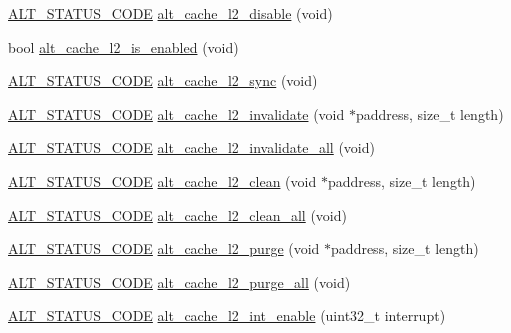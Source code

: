 \begin{DoxyCompactItemize}
\mbox{\hyperlink{hwlib_8h_abdb0d369f069723ca55d6c94bcaaaa12}{A\+L\+T\+\_\+\+S\+T\+A\+T\+U\+S\+\_\+\+C\+O\+DE}} \mbox{\hyperlink{group__CACHE__L2_gad6db03b517205f1d0dff0db2df8ba90c}{alt\+\_\+cache\+\_\+l2\+\_\+disable}} (void)
\item 
bool \mbox{\hyperlink{group__CACHE__L2_ga711945a9d1def9077fb84de19307f239}{alt\+\_\+cache\+\_\+l2\+\_\+is\+\_\+enabled}} (void)
\item 
\mbox{\hyperlink{hwlib_8h_abdb0d369f069723ca55d6c94bcaaaa12}{A\+L\+T\+\_\+\+S\+T\+A\+T\+U\+S\+\_\+\+C\+O\+DE}} \mbox{\hyperlink{group__CACHE__L2_gaf1ee900f730914ee04eb77b6eaaa0c2e}{alt\+\_\+cache\+\_\+l2\+\_\+sync}} (void)
\item 
\mbox{\hyperlink{hwlib_8h_abdb0d369f069723ca55d6c94bcaaaa12}{A\+L\+T\+\_\+\+S\+T\+A\+T\+U\+S\+\_\+\+C\+O\+DE}} \mbox{\hyperlink{group__CACHE__L2_ga8966481a84ce459a27cb6d4083a0db50}{alt\+\_\+cache\+\_\+l2\+\_\+invalidate}} (void $\ast$paddress, size\+\_\+t length)
\item 
\mbox{\hyperlink{hwlib_8h_abdb0d369f069723ca55d6c94bcaaaa12}{A\+L\+T\+\_\+\+S\+T\+A\+T\+U\+S\+\_\+\+C\+O\+DE}} \mbox{\hyperlink{group__CACHE__L2_ga1cdb7173953544d39d40faecd51cdbc5}{alt\+\_\+cache\+\_\+l2\+\_\+invalidate\+\_\+all}} (void)
\item 
\mbox{\hyperlink{hwlib_8h_abdb0d369f069723ca55d6c94bcaaaa12}{A\+L\+T\+\_\+\+S\+T\+A\+T\+U\+S\+\_\+\+C\+O\+DE}} \mbox{\hyperlink{group__CACHE__L2_ga3db8001307963ac2d2f0ff90e13ca884}{alt\+\_\+cache\+\_\+l2\+\_\+clean}} (void $\ast$paddress, size\+\_\+t length)
\item 
\mbox{\hyperlink{hwlib_8h_abdb0d369f069723ca55d6c94bcaaaa12}{A\+L\+T\+\_\+\+S\+T\+A\+T\+U\+S\+\_\+\+C\+O\+DE}} \mbox{\hyperlink{group__CACHE__L2_ga0e34cd30b2e77d846ead21b8ac95f715}{alt\+\_\+cache\+\_\+l2\+\_\+clean\+\_\+all}} (void)
\item 
\mbox{\hyperlink{hwlib_8h_abdb0d369f069723ca55d6c94bcaaaa12}{A\+L\+T\+\_\+\+S\+T\+A\+T\+U\+S\+\_\+\+C\+O\+DE}} \mbox{\hyperlink{group__CACHE__L2_ga4dbc7de380de66569cf924bf09a14cf6}{alt\+\_\+cache\+\_\+l2\+\_\+purge}} (void $\ast$paddress, size\+\_\+t length)
\item 
\mbox{\hyperlink{hwlib_8h_abdb0d369f069723ca55d6c94bcaaaa12}{A\+L\+T\+\_\+\+S\+T\+A\+T\+U\+S\+\_\+\+C\+O\+DE}} \mbox{\hyperlink{group__CACHE__L2_ga5445bd6e07c38ab4fa8fde65e83217a5}{alt\+\_\+cache\+\_\+l2\+\_\+purge\+\_\+all}} (void)
\item 
\mbox{\hyperlink{hwlib_8h_abdb0d369f069723ca55d6c94bcaaaa12}{A\+L\+T\+\_\+\+S\+T\+A\+T\+U\+S\+\_\+\+C\+O\+DE}} \mbox{\hyperlink{group__CACHE__L2_ga5cd474d1aebc852e901ddc988de2a62d}{alt\+\_\+cache\+\_\+l2\+\_\+int\+\_\+enable}} (uint32\+\_\+t interrupt)

\end{DoxyCompactItemize}
